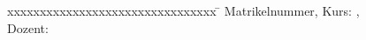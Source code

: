 \begin{titlepage}
\begin{center}
\vspace{1cm}


 

\end{center}
\vspace{1.0cm}
\begin{addmargin}[1cm]{0cm} %
\begin{tabbing}

xxxxxxxxxxxxxxxxxxxxxxxxxxxxxxxx	\=	\kill
Matrikelnummer, Kurs: 				\>	\matrikelnummer, \kurs					\\
Dozent:								\>	\dozent							\\	
\end{tabbing}
\end{addmargin}

\vfill

\end{titlepage}